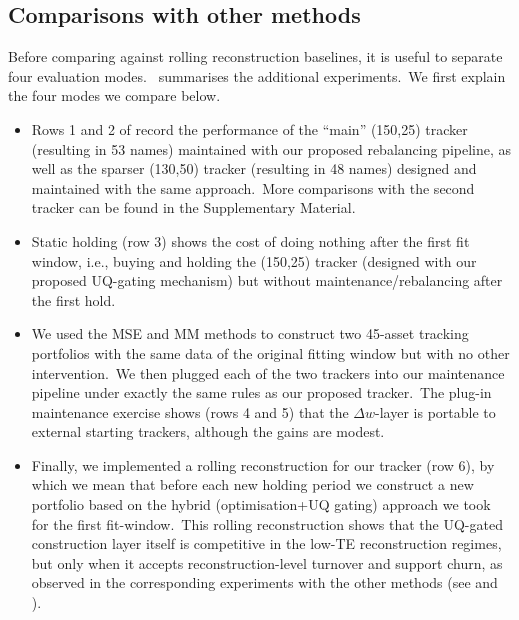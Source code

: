 \documentclass[11pt]{article}
\begin{document}
\FloatBarrier

\subsection{Comparisons with other methods}
\label{sec:case-competitors}

\vspace{1em}

Before comparing against rolling reconstruction baselines, it is useful to separate four evaluation modes.\  summarises the additional experiments.\ We first explain the four modes we compare below. 

\begin{itemize}

\item Rows 1 and 2 of  record the performance of the ``main'' (150,25) tracker (resulting in 53 names) maintained with our proposed rebalancing pipeline, as well as the sparser (130,50) tracker (resulting in 48 names) designed and maintained with the same approach.\ More comparisons with the second tracker can be found in the Supplementary Material.\

\item Static holding (row 3) shows the cost of doing nothing after the first fit window, i.e., buying and holding the (150,25) tracker (designed with our proposed UQ-gating mechanism) but without maintenance/rebalancing after the first hold.\ 

\item We used the MSE and MM methods to construct two 45-asset tracking portfolios with the same data of the original fitting window but with no other intervention.\ We then plugged each of the two trackers into our maintenance pipeline under exactly the same rules as our proposed tracker.\ The plug-in maintenance exercise shows (rows 4 and 5) that the $\Delta w$-layer is portable to external starting trackers, although the gains are modest.\ 

\item Finally, we implemented a rolling reconstruction for our tracker (row 6), by which we mean that before each new holding period we construct a new portfolio based on the hybrid (optimisation+UQ gating) approach we took for the first fit-window.\ This rolling reconstruction shows that the UQ-gated construction layer itself is competitive in the low-TE reconstruction regimes, but only when it accepts reconstruction-level turnover and support churn, as observed in the corresponding experiments with the other methods (see   and ).\
\end{itemize}
\end{document}
